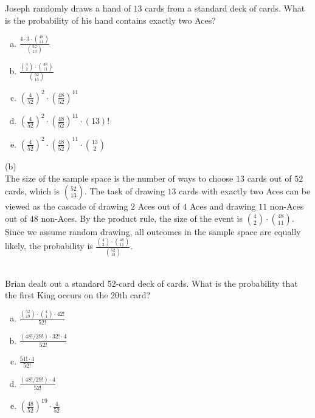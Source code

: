 Joseph randomly draws a hand of $13$ cards from a standard deck of cards. What is the probability of his hand contains exactly two Aces?
\begin{enumerate}[(a)]
	\item  $\frac{4\cdot3\cdot\binom{48}{11}}{\binom{52}{13}}$

	\item  $\frac{\binom{4}{2}\cdot\binom{48}{11}}{\binom{52}{13}}$

	\item  $\left(\frac{4}{52}\right)^2\cdot\left(\frac{48}{52}\right)^{11}$

	\item  $\left(\frac{4}{52}\right)^2\cdot\left(\frac{48}{52}\right)^{11}\cdot(13)!$

	\item  $\left(\frac{4}{52}\right)^2\cdot\left(\frac{48}{52}\right)^{11}\cdot\binom{13}{2}$

\end{enumerate}
\begin{solution}

(b)\\
The size of the sample space is the number of ways to choose $13$ cards out of $52$ cards, which is $\binom{52}{13}$. The task of drawing $13$ cards with exactly two Aces can be viewed as the cascade of drawing $2$ Aces out of $4$ Aces and drawing $11$ non-Aces out of $48$ non-Aces. By the product rule, the size of the event is $\binom{4}{2}\cdot\binom{48}{11}$. Since we assume random drawing, all outcomes in the sample space are equally likely, the probability is $\frac{\binom{4}{2}\cdot\binom{48}{11}}{\binom{52}{13}}$.

\end{solution}
\\
Brian dealt out a standard 52-card deck of cards. What is the probability that the first King occurs on the 20th card?
\begin{enumerate}[(a)]
	\item  $\frac{\binom{52}{19}\cdot\binom{4}{1}\cdot42!}{52!}$

	\item  $\frac{(48!/29!)\cdot32!\cdot4}{52!}$

	\item  $\frac{51!\cdot4}{52!}$

	\item  $\frac{(48!/29!)\cdot4}{52!}$

	\item  $(\frac{48}{52})^{19}\cdot\frac{4}{52}$

\end{enumerate}

